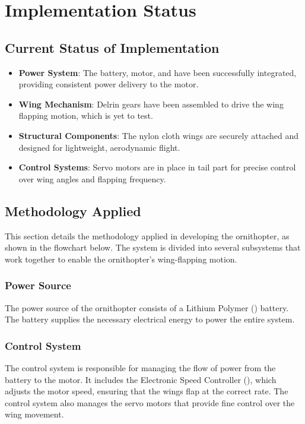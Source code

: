 \chapter{Implementation Status}

\section{Current Status of Implementation}
\begin{itemize}
    \item \textbf{Power System}: The \lipo battery, \bldc motor, and \esc have been successfully integrated, providing consistent power delivery to the motor.
    
    \item \textbf{Wing Mechanism}: Delrin gears have been assembled to drive the wing flapping motion, which is yet to test.
    
    \item \textbf{Structural Components}: The nylon cloth wings are securely attached and designed for lightweight, aerodynamic flight.
    
    \item \textbf{Control Systems}: Servo motors are in place in tail part for precise control over wing angles and flapping frequency.
\end{itemize}

\section{Methodology Applied}
This section details the methodology applied in developing the ornithopter, as shown in the flowchart below. The system is divided into several subsystems that work together to enable the ornithopter's wing-flapping motion.

\subsection{Power Source}
The power source of the ornithopter consists of a Lithium Polymer (\lipo) battery. The battery supplies the necessary electrical energy to power the entire system.

\subsection{Control System}
The control system is responsible for managing the flow of power from the battery to the \bldc motor. It includes the Electronic Speed Controller (\esc), which adjusts the motor speed, ensuring that the wings flap at the correct rate. The control system also manages the servo motors that provide fine control over the wing movement.

